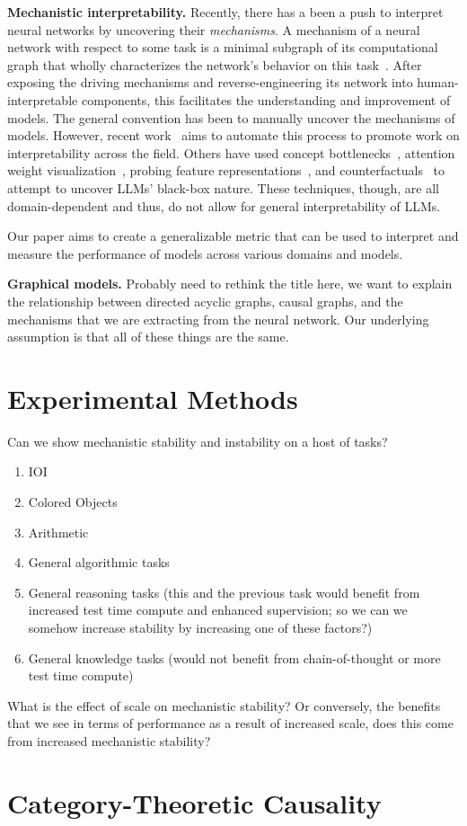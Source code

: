 \documentclass[10pt]{article}
\begin{document}
\textbf{Mechanistic interpretability.} Recently, there has a been a push to interpret
neural networks by uncovering their
\textit{mechanisms}. A mechanism of a neural network with respect to some task
is a minimal subgraph of its computational graph that wholly characterizes the
network's behavior on this task~\citep{wang_interpretability_2022}. After exposing
the driving mechanisms and reverse-engineering its network into human-interpretable
components, this facilitates the understanding and improvement of models.  The general
convention has been to manually uncover the mechanisms of models. However, recent work~\citep{conmy_towards_2023}
aims to automate this process to promote work on interpretability across the field. Others 
have used concept bottlenecks~\citep{tan_interpreting_2023}, attention weight 
visualization~\citep{galassi_attention_2020}, probing feature representations~\citep{lundberg_a_2017}, and 
counterfactuals~\citep{wu_polyjuice_2021} to attempt to uncover LLMs' black-box nature. These techniques, 
though, are all domain-dependent and thus, do not allow for general interpretability of LLMs.

Our paper aims to create a generalizable metric that can be used to interpret and measure the performance 
of models across various domains and models.

\textbf{Graphical models.} Probably need to rethink the title here, we want
to explain the relationship between directed acyclic graphs, causal graphs,
and the mechanisms that we are extracting from the neural network. Our
underlying assumption is that all of these things are the same.

\section{Experimental Methods}
Can we show mechanistic stability and instability on a host of tasks?
\begin{enumerate}
\item IOI
\item Colored Objects
\item Arithmetic
\item General algorithmic tasks
\item General reasoning tasks (this and the previous task would benefit
from increased test time compute and enhanced supervision; so we can we
somehow increase stability by increasing one of these factors?)
\item General knowledge tasks (would not benefit from chain-of-thought or more
test time compute)
\end{enumerate}
What is the effect of scale on mechanistic stability? Or conversely, the benefits
that we see in terms of performance as a result of increased scale, does this
come from increased mechanistic stability?




\newpage
\section{Category-Theoretic Causality}
\end{document}
